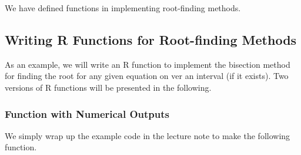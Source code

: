 \documentclass[
]{book}
\begin{document}
We have defined functions in implementing root-finding methods.

\hfill\break

\hypertarget{writing-r-functions-for-root-finding-methods}{%
\subsection{Writing R Functions for Root-finding Methods}\label{writing-r-functions-for-root-finding-methods}}

As an example, we will write an R function to implement the bisection method for finding the root for any given equation on ver an interval (if it exists). Two versions of R functions will be presented in the following.

\hypertarget{function-with-numerical-outputs}{%
\subsubsection{Function with Numerical Outputs}\label{function-with-numerical-outputs}}

We simply wrap up the example code in the lecture note to make the following function.
\end{document}
